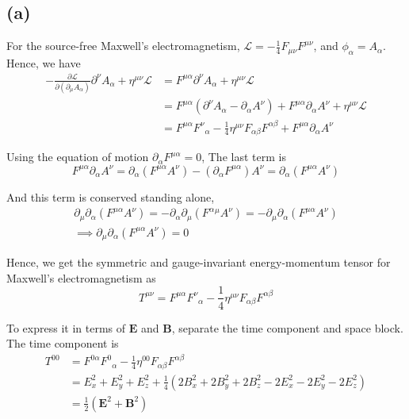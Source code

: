 \documentclass[a4paper,11pt]{article}
\begin{document}
\subsection{(a)}

For the source-free Maxwell's electromagnetism, $\mathcal{L} = -\frac{1}{4}F_{\mu\nu}F^{\mu\nu}$, and $\phi_\alpha = A_\alpha$. Hence, we have
\begin{align}
    -\frac{\partial \mathcal{L}}{\partial(\partial_\mu A_\alpha)}\partial^\nu A_\alpha + \eta^{\mu\nu}\mathcal{L} &= F^{\mu\alpha}\partial^\nu A_\alpha + \eta^{\mu\nu}\mathcal{L} \\
    &= F^{\mu\alpha}(\partial^\nu A_\alpha - \partial_\alpha A^\nu) + F^{\mu\alpha}\partial_\alpha A^\nu + \eta^{\mu\nu}\mathcal{L} \\
    &= F^{\mu\alpha}F^\nu{}_\alpha -\frac{1}{4}\eta^{\mu\nu}F_{\alpha\beta}F^{\alpha\beta} + F^{\mu\alpha}\partial_\alpha A^\nu
\end{align}

Using the equation of motion $\partial_\alpha F^{\mu\alpha} = 0$, The last term is
\begin{equation}
    F^{\mu\alpha}\partial_\alpha A^\nu = \partial_\alpha(F^{\mu\alpha}A^\nu) - (\partial_\alpha F^{\mu\alpha})A^\nu = \partial_\alpha(F^{\mu\alpha}A^\nu)
\end{equation}

And this term is conserved standing alone, 
\begin{gather}
    \partial_\mu \partial_\alpha(F^{\mu\alpha}A^\nu) = -\partial_\alpha\partial_\mu(F^\alpha{}^\mu A^\nu) = -\partial_\mu \partial_\alpha(F^{\mu\alpha}A^\nu) \\
    \implies \partial_\mu \partial_\alpha(F^{\mu\alpha}A^\nu) = 0
\end{gather}

Hence, we get the symmetric and gauge-invariant energy-momentum tensor for Maxwell's electromagnetism as
\begin{equation}
    T^{\mu\nu} = F^{\mu\alpha}F^\nu{}_\alpha - \frac{1}{4}\eta^{\mu\nu}F_{\alpha\beta}F^{\alpha\beta}
\end{equation}

To express it in terms of $\mathbf{E}$ and $\mathbf{B}$, separate the time component and space block. The time component is
\begin{align}
    T^{00} &= F^{0\alpha}F^0{}_\alpha - \frac{1}{4}\eta^{00}F_{\alpha\beta}F^{\alpha\beta}\\
    &= E_x^2 + E_y^2 + E_z^2 + \frac{1}{4}(2B_x^2 + 2B_y^2 + 2B_z^2 - 2E_x^2 - 2E_y^2 - 2E_z^2)\\
    &= \frac{1}{2}(\mathbf{E}^2 + \mathbf{B}^2)
\end{align}
\end{document}
